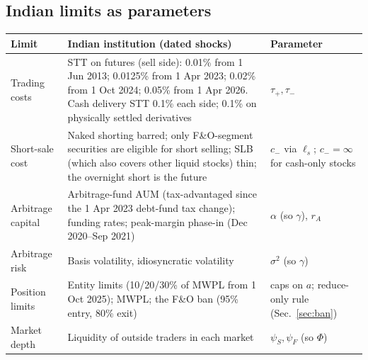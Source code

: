 \documentclass[11pt,a4paper]{article}
\theoremstyle{plain}
\theoremstyle{definition}
\theoremstyle{remark}
\begin{document}
\subsection{Indian limits as parameters}
\begin{center}
\small
\begin{tabularx}{\textwidth}{>{\raggedright\arraybackslash}p{3.4cm}>{\raggedright\arraybackslash}X>{\raggedright\arraybackslash}p{3.0cm}}
\toprule
Limit & Indian institution (dated shocks) & Parameter \\
\midrule
Trading costs & STT on futures (sell side): 0.01\% from 1 Jun 2013; 0.0125\% from 1 Apr 2023; 0.02\% from 1 Oct 2024; 0.05\% from 1 Apr 2026. Cash delivery STT 0.1\% each side; 0.1\% on physically settled derivatives & $\tau_+,\tau_-$ \\
Short-sale cost & Naked shorting barred; only F\&O-segment securities are eligible for short selling; SLB (which also covers other liquid stocks) thin; the overnight short is the future & $c_-$ via $\ell_s$; $c_-=\infty$ for cash-only stocks \\
Arbitrage capital & Arbitrage-fund AUM (tax-advantaged since the 1 Apr 2023 debt-fund tax change); funding rates; peak-margin phase-in (Dec 2020--Sep 2021) & $\alpha$ (so $\gamma$), $r_A$ \\
Arbitrage risk & Basis volatility, idiosyncratic volatility & $\sigma^2$ (so $\gamma$) \\
Position limits & Entity limits (10/20/30\% of MWPL from 1 Oct 2025); MWPL; the F\&O ban (95\% entry, 80\% exit) & caps on $a$; reduce-only rule (Sec.~\ref{sec:ban}) \\
Market depth & Liquidity of outside traders in each market & $\psi_S,\psi_F$ (so $\Phi$) \\
\bottomrule
\end{tabularx}
\end{center}

\end{document}
